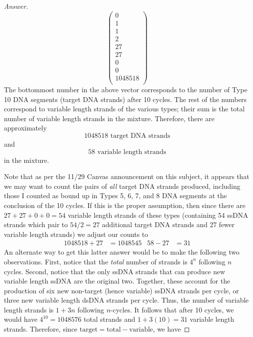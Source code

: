 \documentclass[../psets.tex]{subfiles}
\begin{document}
\begin{enumerate}
\begin{enumerate}
\begin{proof}[Answer]
\begin{equation*}
\begin{pmatrix}
                    0\\
                    1\\
                    1\\
                    2\\
                    27\\
                    27\\
                    0\\
                    0\\
                    \num{1048518}\\
                \end{pmatrix}
            \end{equation*}
            The bottommost number in the above vector corresponds to the number of Type 10 DNA segments (target DNA strands) after 10 cycles. The rest of the numbers correspond to variable length strands of the various types; their sum is the total number of variable length strands in the mixture. Therefore, there are approximately
            \begin{equation*}
                \boxed{\num{1048518}\text{ target DNA strands}}
            \end{equation*}
            and
            \begin{equation*}
                \boxed{58\text{ variable length strands}}
            \end{equation*}
            in the mixture.\par
            Note that as per the 11/29 Canvas announcement on this subject, it appears that we may want to count the pairs of \emph{all} target DNA strands produced, including those I counted as bound up in Types 5, 6, 7, and 8 DNA segments at the conclusion of the 10 cycles. If this is the proper assumption, then since there are $27+27+0+0=54$ variable length strands of these types (containing 54 ssDNA strands which pair to $54/2=27$ additional target DNA strands and 27 fewer variable length strands) we adjust our counts to
            \begin{align*}
                \num{1048518}+27 &= \num{1048545}&
                58-27 &= 31
            \end{align*}
            An alternate way to get this latter answer would be to make the following two observations. First, notice that the \emph{total} number of strands is $4^n$ following $n$ cycles. Second, notice that the only ssDNA strands that can produce new variable length ssDNA are the original two. Together, these account for the production of six new non-target (hence variable) ssDNA strands per cycle, or three new variable length dsDNA strands per cycle. Thus, the number of variable length strands is $1+3n$ following $n$-cycles. It follows that after 10 cycles, we would have $4^{10}=\num{1048576}$ total strands and $1+3(10)=31$ variable length strands. Therefore, since $\text{target}=\text{total}-\text{variable}$, we have

\end{proof}
\end{enumerate}
\end{enumerate}
\end{document}
